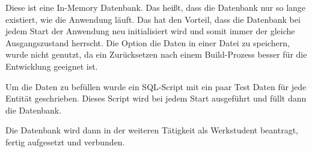 Diese ist eine In-Memory Datenbank. Das heißt, dass die Datenbank nur so lange existiert, wie die Anwendung läuft.
Das hat den Vorteil, dass die Datenbank bei jedem Start der Anwendung neu initialisiert wird und somit immer der gleiche Ausgangszustand herrscht.
Die Option die Daten in einer Datei zu speichern, wurde nicht genutzt, da ein Zurücksetzen nach einem Build-Prozess besser für die Entwicklung geeignet ist.

Um die Daten zu befüllen wurde ein SQL-Script mit ein paar Test Daten für jede Entität geschrieben. Dieses Script wird bei jedem Start ausgeführt und
füllt dann die Datenbank.

Die Datenbank wird dann in der weiteren Tätigkeit als Werkstudent beantragt, fertig aufgesetzt und verbunden.

